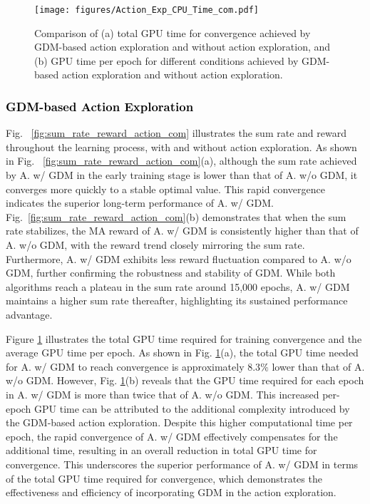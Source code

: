 \documentclass[comsoc,journal]{IEEEtran}
\begin{document}
\begin{figure}[!t]
    \centering
    \texttt{[image: figures/Action\_Exp\_CPU\_Time\_com.pdf]}
    \caption{Comparison of (a) total GPU time for convergence achieved by GDM-based action exploration and without action exploration, and (b) GPU time per epoch for different conditions achieved by GDM-based action exploration and without action exploration.
   }  
    \label{fig:GPU Time Action exp}
\end{figure} 
\subsubsection{ \textcolor{black}{GDM-based Action Exploration}}
Fig. ~\ref{fig:sum_rate_reward_action_com} illustrates the sum rate and reward throughout the learning process, with and without action exploration. As shown in Fig. ~\ref{fig:sum_rate_reward_action_com}(a), although the sum rate achieved by A. w/ GDM in the early training stage is lower than that of A. w/o GDM, it converges more quickly to a stable optimal value. This rapid convergence indicates the superior long-term performance of A. w/ GDM. Fig.~\ref{fig:sum_rate_reward_action_com}(b) demonstrates that when the sum rate stabilizes, the MA reward of A. w/ GDM is consistently higher than that of A. w/o GDM, with the reward trend closely mirroring the sum rate. Furthermore, A. w/ GDM exhibits less reward fluctuation compared to A. w/o GDM, further confirming the robustness and stability of GDM. While both algorithms reach a plateau in the sum rate around 15,000 epochs, A. w/ GDM maintains a higher sum rate thereafter, highlighting its sustained performance advantage. 


Figure \ref{fig:GPU Time Action exp} illustrates the total GPU time required for training convergence and the average GPU time per epoch. As shown in Fig. \ref{fig:GPU Time Action exp}(a), the total GPU time needed for A. w/ GDM to reach convergence is approximately 8.3$\%$ lower than that of A. w/o GDM. However, Fig. \ref{fig:GPU Time Action exp}(b) reveals that the GPU time required for each epoch in A. w/ GDM is more than twice that of A. w/o GDM. This increased per-epoch GPU time can be attributed to the additional complexity introduced by the GDM-based action exploration. Despite this higher computational time per epoch, the rapid convergence of A. w/ GDM effectively compensates for the additional time, resulting in an overall reduction in total GPU time for convergence.
This underscores the superior performance of A. w/ GDM in terms of the total GPU time required for convergence, which demonstrates the effectiveness and efficiency of incorporating GDM in the action exploration.
\end{document}
